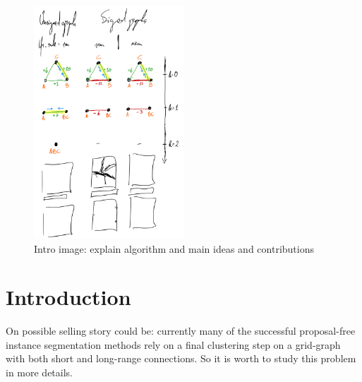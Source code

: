 
\begin{figure}
\centering
\includegraphics[width=0.50\textwidth,trim=0.in 0.in 0.in 0.in,clip]{./figs/intro_image.png}
\caption{\small 
Intro image: explain algorithm and main ideas and contributions
\label{fig:intro_figure}}
\end{figure}


\section{Introduction}
On possible selling story could be: currently many of the successful proposal-free instance segmentation methods rely on a final clustering step on a grid-graph with both short and long-range connections. So it is worth to study this problem in more details. 


